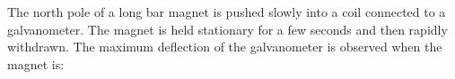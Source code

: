 The north pole of a long bar magnet is pushed slowly into a %
coil connected to a galvanometer.
The magnet is held  %
stationary for a few seconds and then rapidly withdrawn. 
The maximum deflection of the 
galvanometer is observed when the magnet is: %